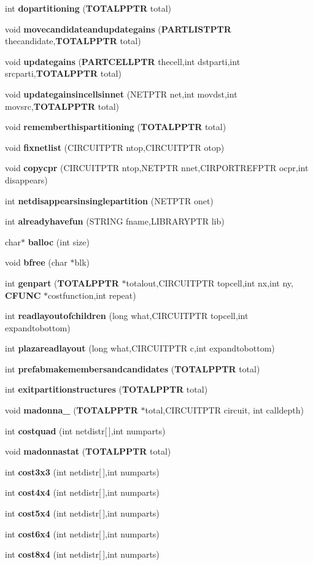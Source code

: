 \begin{CompactItemize}
int {\bf dopartitioning} ({\bf TOTALPPTR} total)
\item 
void {\bf movecandidateandupdategains} ({\bf PARTLISTPTR} thecandidate,{\bf TOTALPPTR} total)
\item 
void {\bf updategains} ({\bf PARTCELLPTR} thecell,int dstparti,int srcparti,{\bf TOTALPPTR} total)
\item 
void {\bf updategainsincellsinnet} (NETPTR net,int movdst,int movsrc,{\bf TOTALPPTR} total)
\item 
void {\bf rememberthispartitioning} ({\bf TOTALPPTR} total)
\item 
void {\bf fixnetlist} (CIRCUITPTR ntop,CIRCUITPTR otop)
\item 
void {\bf copycpr} (CIRCUITPTR ntop,NETPTR nnet,CIRPORTREFPTR ocpr,int disappears)
\item 
int {\bf netdisappearsinsinglepartition} (NETPTR onet)
\item 
int {\bf alreadyhavefun} (STRING fname,LIBRARYPTR lib)
\item 
char$\ast$ {\bf balloc} (int size)
\item 
void {\bf bfree} (char $\ast$blk)
\item 
int {\bf genpart} ({\bf TOTALPPTR} $\ast$totalout,CIRCUITPTR topcell,int nx,int ny, {\bf CFUNC} $\ast$costfunction,int repeat)
\item 
int {\bf readlayoutofchildren} (long what,CIRCUITPTR topcell,int expandtobottom)
\item 
int {\bf plazareadlayout} (long what,CIRCUITPTR c,int expandtobottom)
\item 
int {\bf prefabmakemembersandcandidates} ({\bf TOTALPPTR} total)
\item 
int {\bf exitpartitionstructures} ({\bf TOTALPPTR} total)
\item 
void {\bf madonna\_\-} ({\bf TOTALPPTR} $\ast$total,CIRCUITPTR circuit, int calldepth)
\item 
int {\bf costquad} (int netdistr[$\,$],int numparts)
\item 
void {\bf madonnastat} ({\bf TOTALPPTR} total)
\item 
int {\bf cost3x3} (int netdistr[$\,$],int numparts)
\item 
int {\bf cost4x4} (int netdistr[$\,$],int numparts)
\item 
int {\bf cost5x4} (int netdistr[$\,$],int numparts)
\item 
int {\bf cost6x4} (int netdistr[$\,$],int numparts)
\item 
int {\bf cost8x4} (int netdistr[$\,$],int numparts)

\end{CompactItemize}
